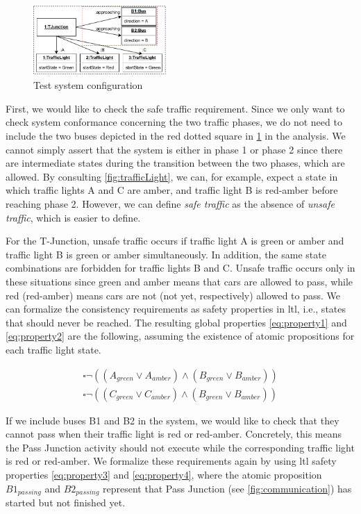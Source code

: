 \documentclass{jot}
\begin{document}
\begin{figure}[h]
    \centering
    \includegraphics[width=0.45\textwidth]{figures/test_config.pdf}
    \caption{Test system configuration}
    \label{fig:test_config}
\end{figure}

First, we would like to check the safe traffic requirement.
Since we only want to check system conformance concerning the two traffic phases, we do not need to include the two buses depicted in the red dotted square in \cref{fig:test_config} in the analysis.
We cannot simply assert that the system is either in phase 1 or phase 2 since there are intermediate states during the transition between the two phases, which are allowed.
By consulting \cref{fig:trafficLight}, we can, for example, expect a state in which traffic lights A and C are amber, and traffic light B is red-amber before reaching phase 2.
However, we can define \emph{safe traffic} as the absence of \emph{unsafe traffic}, which is easier to define.

For the T-Junction, unsafe traffic occurs if traffic light A is green or amber and traffic light B is green or amber simultaneously.
In addition, the same state combinations are forbidden for traffic lights B and C.
Unsafe traffic occurs only in these situations since green and amber means that cars are allowed to pass, while red (red-amber) means cars are not (not yet, respectively) allowed to pass.
We can formalize the consistency requirements as safety properties in \gls*{ltl}, i.e., states that should never be reached.
The resulting global properties \eqref{eq:property1} and \eqref{eq:property2} are the following, assuming the existence of atomic propositions for each traffic light state. 

\begin{align}
    \square\neg((A_{green} \lor A_{amber}) \land (B_{green} \lor B_{amber})) \label{eq:property1} \\
    \square\neg((C_{green} \lor C_{amber}) \land (B_{green} \lor B_{amber})) \label{eq:property2}
\end{align}

If we include buses \textsf{B1} and \textsf{B2} in the system, we would like to check that they cannot pass when their traffic light is red or red-amber.
Concretely, this means the \textsf{Pass Junction} activity should not execute while the corresponding traffic light is \textsf{red} or \textsf{red-amber}.
We formalize these requirements again by using \gls*{ltl} safety properties \eqref{eq:property3} and \eqref{eq:property4}, where the atomic proposition $B1_{passing}$ and $B2_{passing}$ represent that \textsf{Pass Junction} (see \cref{fig:communication}) has started but not finished yet.
\end{document}
